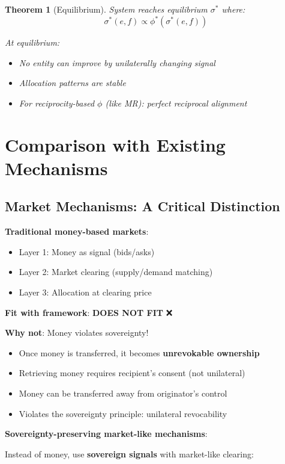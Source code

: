 \documentclass[11pt,a4paper]{article}
\newtheorem{theorem}{Theorem}[section]
\theoremstyle{definition}
\theoremstyle{remark}
\begin{document}
\begin{theorem}[Equilibrium]
System reaches equilibrium $\sigma^*$ where:
\[ \sigma^*(e,f) \propto \phi^*(\sigma^*(e,f)) \]

At equilibrium:
\begin{itemize}
\item No entity can improve by unilaterally changing signal
\item Allocation patterns are stable
\item For reciprocity-based $\phi$ (like MR): perfect reciprocal alignment
\end{itemize}
\end{theorem}

\section{Comparison with Existing Mechanisms}

\subsection{Market Mechanisms: A Critical Distinction}

\textbf{Traditional money-based markets}:
\begin{itemize}
\item Layer 1: Money as signal (bids/asks)
\item Layer 2: Market clearing (supply/demand matching)
\item Layer 3: Allocation at clearing price
\end{itemize}

\textbf{Fit with framework}: \textbf{DOES NOT FIT} ❌

\textbf{Why not}: Money violates sovereignty!
\begin{itemize}
\item Once money is transferred, it becomes \textbf{unrevokable ownership}
\item Retrieving money requires recipient's consent (not unilateral)
\item Money can be transferred away from originator's control
\item Violates the sovereignty principle: unilateral revocability
\end{itemize}

\textbf{Sovereignty-preserving market-like mechanisms}:

Instead of money, use \textbf{sovereign signals} with market-like clearing:
\end{document}
